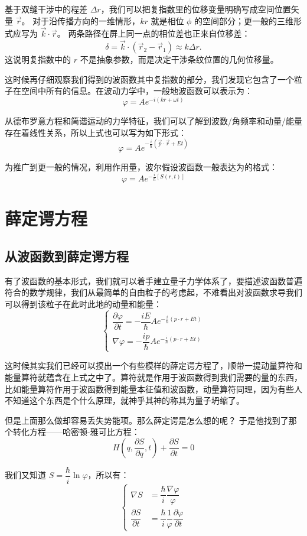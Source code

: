 \documentclass[UTF8]{ctexbook}
\begin{document}
基于双缝干涉中的程差 \(\Delta r\)，我们可以把复指数里的位移变量明确写成空间位置矢量 \(\vec{r}\)。
对于沿传播方向的一维情形，\(k r\) 就是相位 \(\phi\) 的空间部分；更一般的三维形式应写为 \(\vec{k}\cdot\vec{r}\)。
两条路径在屏上同一点的相位差也正来自位移差：
\[
\delta=\vec{k}\cdot(\vec{r}_2-\vec{r}_1)\approx k\Delta r.
\]
这说明复指数中的 \(r\) 不是抽象参数，而是决定干涉条纹位置的几何位移量。


这时候再仔细观察我们得到的波函数其中复指数的部分，我们发现它包含了一个粒子在空间中所有的信息。在波动力学中，一般地波函数可以表示为：
\[
\varphi = A e^{-i(kr+\omega t)}
\]

从德布罗意方程和简谐运动的力学特征，我们可以了解到波数/角频率和动量/能量存在着线性关系，所以上式也可以写为如下形式：
\[
\varphi = A e^{-\frac{i}{\hbar}(\vec{p}\cdot \vec{r}+Et)}
\]

为推广到更一般的情况，利用作用量，波尔假设波函数一般表达为的格式：
\[
\varphi = A e^{-\frac{i}{\hbar}[S(r,t)]}
\]

\newpage
\section{薛定谔方程}

\subsection{从波函数到薛定谔方程}

有了波函数的基本形式，我们就可以着手建立量子力学体系了，要描述波函数普遍符合的数学规律，我们从最简单的自由粒子的考虑起，不难看出对波函数求导我们可以得到该粒子在此时此地的动量和能量：
\[
\begin{cases}
\dfrac{\partial\varphi}{\partial t}=-\dfrac{iE}{\hbar}A e^{-\frac{i}{\hbar}(p\cdot r+Et)}\\[0.8em]
\nabla\varphi=-\dfrac{ip}{\hbar}A e^{-\frac{i}{\hbar}(p\cdot r+Et)}
\end{cases}
\]

这时候其实我们已经可以摸出一个有些模样的薛定谔方程了，顺带一提动量算符和能量算符就蕴含在上式之中了。算符就是作用于波函数得到我们需要的量的东西，比如能量算符作用于波函数得到能量本征值和波函数，动量算符同理，因为有些人不知道这个东西是个什么原理，就神乎其神的称其为量子坍缩了。

但是上面那么做却容易丢失势能项。那么薛定谔是怎么想的呢？
于是他找到了那个转化方程——哈密顿-雅可比方程：
\[
H\left(q,\dfrac{\partial S}{\partial q},t\right)+\dfrac{\partial S}{\partial t}=0
\]

我们又知道 \(S=\dfrac{\hbar}{i}\ln\varphi\)，所以有：
\[
\left\{
\begin{aligned}
\nabla S &= \dfrac{\hbar}{i}\dfrac{\nabla\varphi}{\varphi}\\[0.8em]
\dfrac{\partial S}{\partial t} &= \dfrac{\hbar}{i}\dfrac{1}{\varphi}\dfrac{\partial\varphi}{\partial t}
\end{aligned}
\right.
\]
\end{document}
